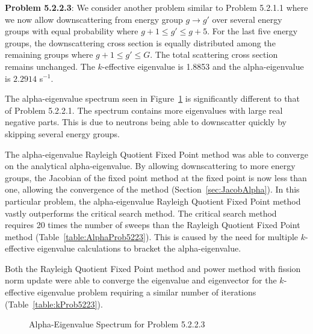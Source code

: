 \textbf{Problem 5.2.2.3}: We consider another problem similar to Problem 5.2.1.1 where we now allow downscattering from energy group $g \rightarrow g'$ over several energy groups with equal probability where $g + 1 \leq g' \leq g+5$. For the last five energy groups, the downscattering cross section is equally distributed among the remaining groups where $g+1 \leq g' \leq G$. The total scattering cross section remains unchanged. The $k$-effective eigenvalue is 1.8853 and the alpha-eigenvalue is $2.2914$ s$^{-1}$.

The alpha-eigenvalue spectrum seen in Figure~\ref{fig:G81P3Spec} is significantly different to that of Problem 5.2.2.1. The spectrum contains more eigenvalues with large real negative parts. This is due to neutrons being able to downscatter quickly by skipping several energy groups.

The alpha-eigenvalue Rayleigh Quotient Fixed Point method was able to converge on the analytical alpha-eigenvalue. By allowing downscattering to more energy groups, the Jacobian of the fixed point method at the fixed point is now less than one, allowing the convergence of the method (Section~\ref{sec:JacobAlpha}). In this particular problem, the alpha-eigenvalue Rayleigh Quotient Fixed Point method vastly outperforms the critical search method. The critical search method requires 20 times the number of sweeps than the Rayleigh Quotient Fixed Point method (Table~\ref{table:AlphaProb5223}). This is caused by the need for multiple $k$-effective eigenvalue calculations to bracket the alpha-eigenvalue.

Both the Rayleigh Quotient Fixed Point method and power method with fission norm update were able to converge the eigenvalue and eigenvector for the $k$-effective eigenvalue problem requiring a similar number of iterations (Table~\ref{table:kProb5223}). 

\begin{figure}[!htbp]
\centering
	\resizebox{0.90\textwidth}{!}{
	}
\caption{Alpha-Eigenvalue Spectrum for Problem 5.2.2.3}
\label{fig:G81P3Spec}
\end{figure}


